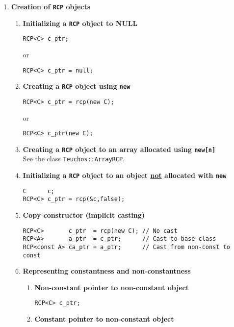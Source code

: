 \documentclass[pdf,ps2pdf,11pt]{SANDreport}
\begin{document}
\begin{enumerate}

\item {\bf Creation of \texttt{RCP} objects}

\begin{enumerate}

\item {\bf Initializing a \texttt{RCP} object to NULL}
\label{rcpqs:apdx:qs:null}
%
{\small\begin{verbatim}
RCP<C> c_ptr;
\end{verbatim}}
or
{\small\begin{verbatim}
RCP<C> c_ptr = null;
\end{verbatim}}

\item {\bf Creating a \texttt{RCP} object using \texttt{new}}
\label{rcpqs:apdx:qs:new}
%
{\small\begin{verbatim}
RCP<C> c_ptr = rcp(new C);
\end{verbatim}}
or
{\small\begin{verbatim}
RCP<C> c_ptr(new C);
\end{verbatim}}
%
\item {\bf Creating a \texttt{RCP} object to an array allocated using \texttt{new[n]}} \\
\label{rcpqs:apdx:qs:array-new}
%
See the class {}\texttt{Teuchos::ArrayRCP}.
%
\item {\bf Initializing a \texttt{RCP} object to an object
       \underline{not} allocated with \texttt{new}}
\label{rcpqs:apdx:qs:not-new}
%
{\small\begin{verbatim}
C      c;
RCP<C> c_ptr = rcp(&c,false);
\end{verbatim}}
%
\item {\bf Copy constructor (implicit casting)}
%
{\small\begin{verbatim}
RCP<C>       c_ptr  = rcp(new C); // No cast
RCP<A>       a_ptr  = c_ptr;      // Cast to base class
RCP<const A> ca_ptr = a_ptr;      // Cast from non-const to const
\end{verbatim}}
%
\item {\bf Representing constantness and non-constantness}
%
\begin{enumerate}
%
\item {\bf Non-constant pointer to non-constant object }
{\small\begin{verbatim}
RCP<C> c_ptr;
\end{verbatim}}
%
\item {\bf Constant pointer to non-constant object }

\end{enumerate}
\end{enumerate}
\end{enumerate}
\end{document}
